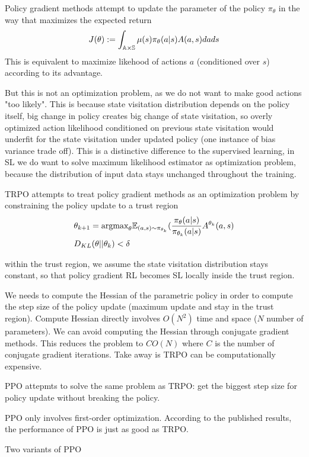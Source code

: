 \documentclass{article}
\begin{document}
Policy gradient methods attempt to update the parameter of the policy
$\pi_{\theta}$ in the way that maximizes the expected return
\[
    J(\theta) := \int_{\mathbb{A} \times \mathbb{S}}\mu(s)
    \pi_{\theta}(a|s)A(a, s) dads
\]
This is equivalent to maximize likehood of actions $a$ (conditioned over
$s$) according to its advantage. 

But this is not an optimization problem, as we do not want to make 
good actions "too likely". This is because state visitation distribution
depends on the policy itself, big change in policy creates big change
of state visitation, so overly optimized action likelihood conditioned
on previous state visitation would underfit for the state visitation 
under updated policy (one instance of bias variance trade off).
This is a distinctive difference to the supervised learning, in SL we 
do want to solve maximum likelihood estimator as optimization problem,
because the distribution of input data stays unchanged throughout the 
training.

TRPO attempts to treat policy gradient methods as an optimization 
problem by constraining the policy update to a trust region
\begin{align*}
    & \theta_{k+1} = \text{argmax}_{\theta} \mathbb{E}_{(a,s)\sim \pi_{\theta_k}} 
        (\frac{\pi_{\theta}(a|s)}{\pi_{\theta_k}(a|s)} A^{\theta_k}(a, s) \\
    & D_{KL}(\theta || \theta_k) < \delta
\end{align*}

within the trust region, we assume the state visitation distribution
stays constant, so that policy gradient RL becomes SL locally inside
the trust region. 

We needs to compute the Hessian of the parametric policy in order to 
compute the step size of the policy update (maximum update and stay in 
the trust region). Compute Hessian directly involves $O(N^2)$ time and
space ($N$ number of parameters). We can avoid computing the Hessian 
through conjugate gradient methods. This reduces the problem to $C O(N)$
where $C$ is the number of conjugate gradient iterations. Take away is
TRPO can be computationally expensive.


PPO attepmts to solve the same problem as TRPO: get the biggest step
size for policy update without breaking the policy. 

PPO only involves first-order optimization. According to the published
results, the performance of PPO is just as good as TRPO. 

Two variants of PPO
\end{document}
